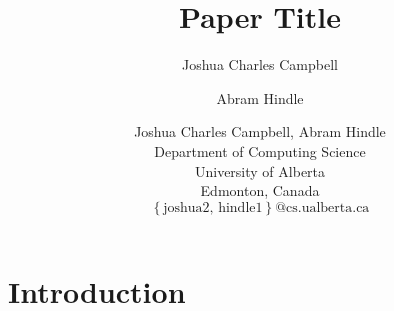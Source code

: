 \documentclass[canadian,12pt]{wlpeerj}
\begin{document}

\title{Paper Title}


\ifpreprint
  \author[1]{Joshua Charles Campbell}
  \author[1]{Abram Hindle}
\else
  \author{Joshua Charles Campbell, Abram Hindle\\
  Department of Computing Science\\
  University of Alberta\\
  Edmonton, Canada\\
  $\left\{ \mbox{joshua2, hindle1}\right\}
  \mbox{@cs.ualberta.ca}$}
%   
\fi


\ifpreprint
  \begin{abstract}
  
  \end{abstract}
\fi




\ifpreprint
{} %
\fi

\maketitle

\ifpreprint
\else
  \begin{abstract}
  
  \end{abstract}
\fi

\section{Introduction}


\balance

\ifpreprint

\else

\fi

\end{document}
